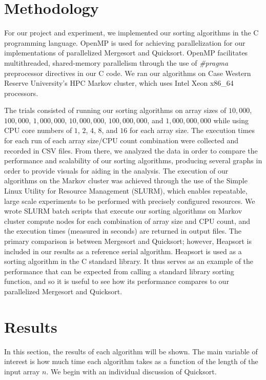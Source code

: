 \documentclass[conference]{IEEEtran}
\begin{document}
    \section{Methodology}
    For our project and experiment, we implemented our sorting algorithms in the C programming language. OpenMP \cite{openmp08} is used for achieving parallelization for our implementations of parallelized Mergesort and Quicksort.
    OpenMP facilitates multithreaded, shared-memory parallelism through the use of \textit{\#pragma} preprocessor directives in our C code.
	We ran our algorithms on Case Western Reserve University's HPC Markov cluster, which uses Intel Xeon x86\_64 processors. 

	The trials consisted of running our sorting algorithms on array sizes of $10,000$, $100,000$, $1,000,000$, $10,000,000$, $100,000,000$, and $1,000,000,000$ while using CPU core numbers of $1$, $2$, $4$, $8$, and $16$ for each array size. The execution times for each run of each array size/CPU count combination were collected and recorded in CSV files. From there, we analyzed the data in order to compare the performance and scalability of our sorting algorithms, producing several graphs in order to provide visuals for aiding in the analysis. The execution of our algorithms on the Markov cluster was achieved through the use of the Simple Linux Utility for Resource Management \cite{yoo_slurm_2003} (SLURM), which enables repeatable, large scale experiments to be performed with precisely configured resources. We wrote SLURM batch scripts that execute our sorting algorithms on Markov cluster compute nodes for each combination of array size and CPU count, and the execution times (measured in seconds) are returned in output files. The primary comparison is between Mergesort and Quicksort; however, Heapsort is included in our results as a reference serial algorithm. Heapsort is used as a sorting algorithm in the C standard library. It thus serves as an example of the performance that can be expected from calling a standard library sorting function, and so it is useful to see how its performance compares to our parallelized Mergesort and Quicksort.
    
    
    \section{Results}
    In this section, the results of each algorithm will be shown. 
    The main variable of interest is how much time each algorithm takes as a function of the length of the input array $n$.
    We begin with an individual discussion of Quicksort. 
    
\end{document}
